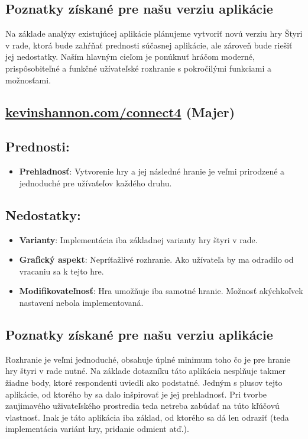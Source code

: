 \documentclass[a4paper, 11pt, onecolumn]{article}
\begin{document}
\subsection*{Poznatky získané pre našu verziu aplikácie}

Na základe analýzy existujúcej aplikácie plánujeme vytvoriť novú verziu hry 
Štyri v rade, ktorá bude zahŕňať prednosti súčasnej aplikácie, ale zároveň 
bude riešiť jej nedostatky. Naším hlavným cieľom je ponúknuť hráčom moderné, 
prispôsobiteľné a funkčné užívateľské rozhranie s pokročilými funkciami 
a možnosťami.
\subsection{ \href{https://kevinshannon.com/connect4/}{kevinshannon.com/connect4} (Majer)}
\subsection*{Prednosti:}
\begin{itemize}
  \item \textbf{Prehladnosť}: Vytvorenie hry a jej následné hranie je veľmi prirodzené a jednoduché pre užívaťeľov každého druhu.
\end{itemize}
\subsection*{Nedostatky:}
\begin{itemize}
  \item \textbf{Varianty}: Implementácia iba základnej varianty hry štyri v rade.
  \item \textbf{Grafický aspekt}: Nepríťažlivé rozhranie. Ako užívateľa by ma odradilo od vracaniu sa k tejto hre.
  \item \textbf{Modifikovateľnosť}: Hra umožňuje iba samotné hranie. Možnosť akýchkoľvek nastavení nebola implementovaná.
\end{itemize}
\subsection*{Poznatky získané pre našu verziu aplikácie}
Rozhranie je veľmi jednoduché, obsahuje úplné minimum toho čo je pre hranie hry štyri v rade nutné. Na základe dotazníku táto
aplikácia nesplňuje takmer žiadne body, ktoré respondenti uviedli ako podstatné. Jedným s plusov tejto aplikácie, od ktorého by
sa dalo inšpirovať je jej prehladnosť. Pri tvorbe zaujimavého uživateľského prostredia teda netreba zabúdať na túto kľúčovú
vlastnosť. Inak je táto aplikácia iba základ, od ktorého sa dá len odraziť (teda implementácia variánt hry, pridanie odmient atď.).
\end{document}
